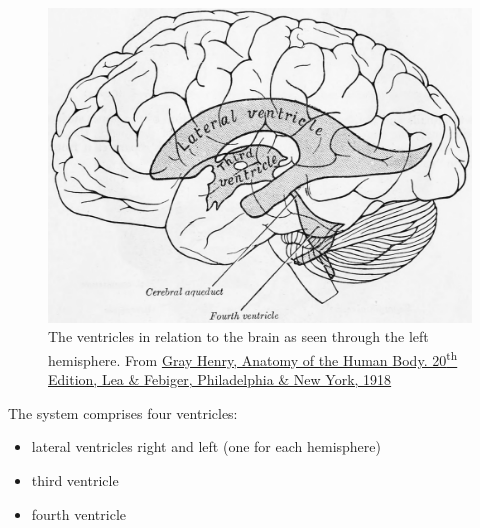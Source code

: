 \begin{figure}

{\centering \includegraphics[width=0.7\linewidth]{./figures/cns/GrayAnat1918p829} 

}

\caption{The ventricles in relation to the brain as seen through the left hemisphere. From \href{https://archive.org/details/anatomyofhumanbo1918gray/page/n6/mode/2up}{Gray Henry, Anatomy of the Human Body. 20\textsuperscript{th} Edition, Lea \& Febiger, Philadelphia \& New York, 1918}}\label{fig:ventriclesbrain}
\end{figure}

The system comprises four ventricles:

\begin{itemize}
\tightlist
\item
  lateral ventricles right and left (one for each hemisphere)
\item
  third ventricle
\item
  fourth ventricle
\end{itemize}



